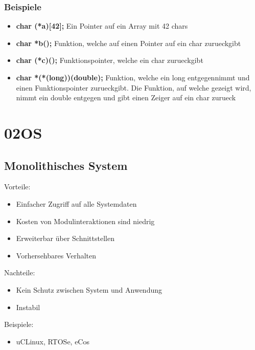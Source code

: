 \documentclass[a4paper]{scrreprt}
\begin{document}
\subsection{Beispiele}
\begin{itemize}
	\item \textbf{char (*a)[42];} Ein Pointer auf ein Array mit 42 chars
	\item \textbf{char *b();} Funktion, welche auf einen Pointer auf ein char zurueckgibt
	\item \textbf{char (*c)();} Funktionspointer, welche ein char zurueckgibt
	\item \textbf{char *(*(long))(double);} Funktion, welche ein long entgegennimmt und einen Funktionspointer zurueckgibt. Die Funktion, auf welche gezeigt wird, nimmt ein double entgegen und gibt einen Zeiger auf ein char zurueck
\end{itemize}











\chapter{02OS}

\section{Monolithisches System}
Vorteile:
	\begin{itemize} 
		\item Einfacher Zugriff auf alle Systemdaten 
		\item Kosten von Modulinteraktionen sind niedrig
		\item Erweiterbar über Schnittstellen
		\item Vorhersehbares Verhalten 
	\end{itemize}
Nachteile:
	\begin{itemize}
		\item Kein Schutz zwischen System und Anwendung
		\item Instabil
	\end{itemize}

Beispiele:
	\begin{itemize}
		\item uCLinux, RTOSe, eCos
	\end{itemize}
	
\end{document}
